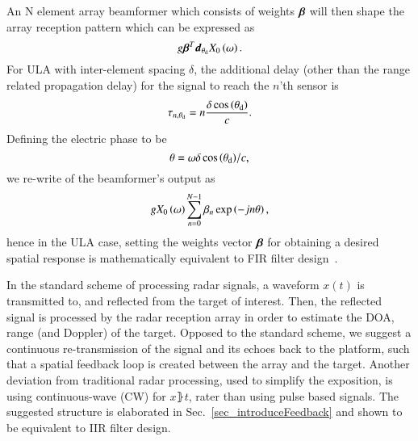 \par An N element array beamformer which consists of weights $\boldsymbol{\beta}$ will then shape the array reception pattern which can be expressed as 
$$ g\vBetaT\vd_{\thetaD}\F{x}_{0}\rBrace{\omega}. $$ 
For ULA with inter-element spacing $\delta$, the additional delay (other than the range related propagation delay) for the signal to reach the $n$'th sensor is
$$
\tau_{n,\theta_{\text{d}}}=n\frac{\delta\cos\left({\theta_{\text{d}}}\right)}{c}.
$$
Defining the electric phase to be
\begin{equation}\label{eq:thetaULA}
\theta=\omega{\delta\cos\Brack{\thetaD}}/{c},
\end{equation}
we re-write of the beamformer's output as 
\[
g\F{x}_0\rBrace{\omega}\sum_{n=0}^{N-1}\beta_n
\exp\Brack{-jn\theta},
\]
hence in the ULA case, setting the weights vector $\boldsymbol{\beta}$ for obtaining a desired spatial response is mathematically equivalent to FIR filter design~\cite{van1988beamforming}.
\par In the standard scheme of processing radar signals, a waveform $x(t)$ is transmitted to, and reflected from the target of interest. Then, the reflected signal is processed by the radar reception array in order to estimate the DOA, range (and Doppler) of the target. 
Opposed to the standard scheme, we suggest a continuous re-transmission of the signal and its echoes back to the platform, such that a spatial feedback loop is created between the array and the target.
Another deviation from traditional radar processing, used to simplify the exposition, is using continuous-wave (CW) for $x\rBrace{t}$, rater than using pulse based signals. The suggested structure is elaborated in Sec.~\ref{sec_introduceFeedback} and shown to be equivalent to IIR filter design.